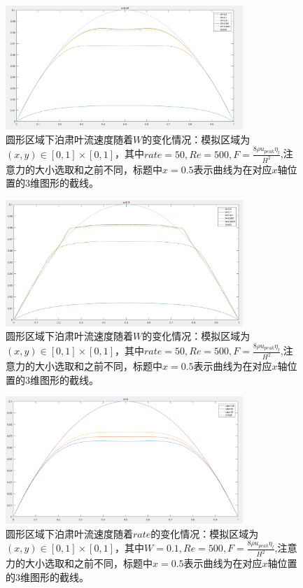 \documentclass[11pt,UTF8]{ctexart}
\begin{document}
    \begin{figure}[h]
        \centerline{\includegraphics[width=0.8\textwidth]{Circula_F_W_x=0_25.PNG}}
        \caption{圆形区域下泊肃叶流速度随着$W$的变化情况：模拟区域为$(x,y)\in [0,1]\times [0,1]$，其中$rate=50,Re=500,F=\frac{8\rho u_{peak} \eta_l}{H^2}$,注意力的大小选取和之前不同，标题中$x=0.5$表示曲线为在对应$x$轴位置的3维图形的截线。}
        \label{img20}
    \end{figure}
    \begin{figure}[h]
        \centerline{\includegraphics[width=0.8\textwidth]{Circula_F_W_x=0_5.PNG}}
        \caption{圆形区域下泊肃叶流速度随着$W$的变化情况：模拟区域为$(x,y)\in [0,1]\times [0,1]$，其中$rate=50,Re=500,F=\frac{8\rho u_{peak} \eta_l}{H^2}$,注意力的大小选取和之前不同，标题中$x=0.5$表示曲线为在对应$x$轴位置的3维图形的截线。}
        \label{img21}
    \end{figure}
    \begin{figure}[h]
        \centerline{\includegraphics[width=0.8\textwidth]{Circula_F_rate_x=0.PNG}}
        \caption{圆形区域下泊肃叶流速度随着$rate$的变化情况：模拟区域为$(x,y)\in [0,1]\times [0,1]$，其中$W=0.1,Re=500,F=\frac{8\rho u_{peak} \eta_l}{H^2}$,注意力的大小选取和之前不同，标题中$x=0.5$表示曲线为在对应$x$轴位置的3维图形的截线。}
        \label{img22}
    \end{figure}
\end{document}
